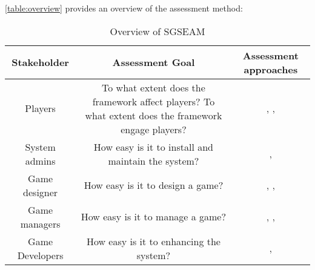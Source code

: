 \documentclass[11pt]{article}
\newcommand\tabhead[1]{\small\textbf{#1}}
\begin{document}
\autoref{table:overview} provides an overview of the assessment method:

\begin{table}[ht!]
  \centering
  \begin{tabular}{|c|c|c|}
    \hline
    \multicolumn{1}{|p{0.2\columnwidth}|}{\centering\tabhead{Stakeholder}} &
    \multicolumn{1}{|p{0.35\columnwidth}|}{\centering\tabhead{Assessment Goal}} &
    \multicolumn{1}{|p{0.35\columnwidth}|}{\centering\tabhead{Assessment approaches}} \\
    \hline
    \multicolumn{1}{|p{0.2\columnwidth}|}{Players} &
    \multicolumn{1}{|p{0.35\columnwidth}|}{To what extent does the framework affect players?
        To what extent does the framework engage players?} &
    \multicolumn{1}{|p{0.35\columnwidth}|}{\nameref{Pre Post effectiveness study}, \nameref{Self-reported usability metrics}, \nameref{Engagement metrics}} \\
    \hline
    \multicolumn{1}{|p{0.2\columnwidth}|}{System admins} &
    \multicolumn{1}{|p{0.35\columnwidth}|}{How easy is it to install and maintain the system?} &
    \multicolumn{1}{|p{0.35\columnwidth}|}{\nameref{Post-hoc system admin interview}, \nameref{In-lab installation study}} \\
    \hline
    \multicolumn{1}{|p{0.2\columnwidth}|}{Game designer} &
    \multicolumn{1}{|p{0.35\columnwidth}|}{How easy is it to design a game?} &
    \multicolumn{1}{|p{0.35\columnwidth}|}{\nameref{Post-hoc game designer interview}, \nameref{In-lab game design study}, \nameref{Game design log data analysis}} \\
    \hline
    \multicolumn{1}{|p{0.2\columnwidth}|}{Game managers} &
    \multicolumn{1}{|p{0.35\columnwidth}|}{How easy is it to manage a game?} &
    \multicolumn{1}{|p{0.35\columnwidth}|}{\nameref{Post-hoc game manager interview}, \nameref{In-lab game management study}, \nameref{Game management log data analysis}} \\
    \hline
    \multicolumn{1}{|p{0.2\columnwidth}|}{Game Developers} &
    \multicolumn{1}{|p{0.35\columnwidth}|}{How easy is it to enhancing the system?} &
    \multicolumn{1}{|p{0.35\columnwidth}|}{\nameref{Post-hoc game developer interview}, \nameref{In-lab game development study}} \\
    \hline
  \end{tabular}
  \caption{Overview of SGSEAM}
  \label{table:overview}
\end{table}
\end{document}
